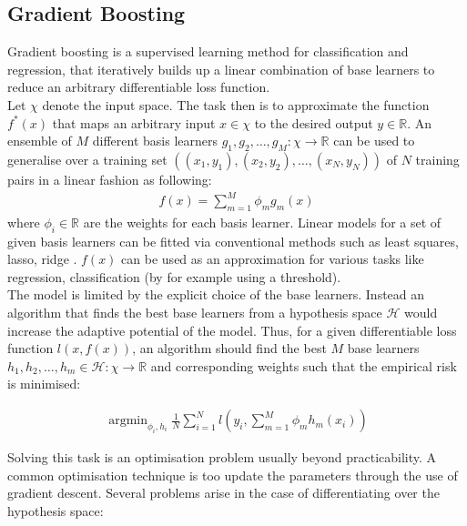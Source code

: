 \documentclass[a4paper, 11pt]{article}
\DeclareMathOperator*{\argmin}{argmin} %
\begin{document}
\subsection{Gradient Boosting}
Gradient boosting is a supervised learning method for classification and regression, that iteratively builds up a linear combination of base learners to reduce an arbitrary differentiable loss function.\\

Let $\chi$ denote the input space. The task then is to approximate the function $f^*(x)$ that maps an arbitrary input $x \in \chi$ to the desired output $y \in \mathbb{R}$. An ensemble of $M$ different basis learners $g_1,g_2,\ldots,g_M: \chi \rightarrow \mathbb{R}$ can be used to generalise over a training set $((x_1, y_1),(x_2,y_2),\ldots,(x_N, y_N))$ of $N$ training pairs in a linear fashion as following:
\begin{align*}
f(x) = \sum_{m=1}^{M}\phi_m g_m(x)
\end{align*}
where $\phi_i \in \mathbb{R}$ are the weights for each basis learner. Linear models for a set of given basis learners can be fitted via conventional methods such as least squares, lasso, ridge \cite{bishop2006pattern}. $f(x)$ can be used as an approximation for various tasks like regression, classification (by for example using a threshold).\\

The model is limited by the explicit choice of the base learners. Instead an algorithm that finds the best base learners from a hypothesis space $\mathcal{H}$ would increase the adaptive potential of the model. Thus, for a given differentiable loss function $l(x, f(x))$, an algorithm should find the best $M$ base learners $h_1, h_2, \ldots, h_m \in \mathcal{H}: \chi \rightarrow \mathbb{R}$ and corresponding weights such that the empirical risk is minimised:

\begin{align}
\argmin_{\phi_i, h_i}\frac{1}{N}\sum_{i = 1}^{N} l(y_i, \sum_{m=1}^{M}\phi_m h_m(x_i))
\end{align}

Solving this task is an optimisation problem usually beyond practicability. A common optimisation technique is too update the parameters through the use of gradient descent. Several problems arise in the case of differentiating over the hypothesis space:
\end{document}
